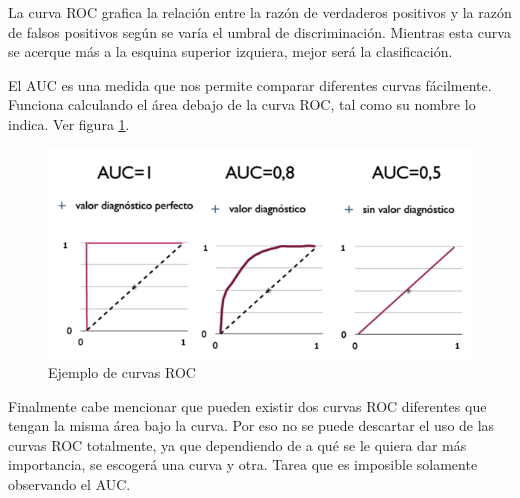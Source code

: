 La curva ROC grafica la relación entre la razón de verdaderos positivos y la razón de falsos positivos según se varía el umbral de discriminación. Mientras esta curva se acerque más a la esquina superior izquiera, mejor será la clasificación.

El \ac{AUC} es una medida que nos permite comparar diferentes curvas fácilmente. Funciona calculando el área debajo de la curva ROC, tal como su nombre lo indica. Ver figura \ref{fig:eg-roc}.

\begin{figure}[htbp]
	\centering
	\includegraphics[width=0.8\linewidth]{graficos/eg_roc.png}
	\caption{Ejemplo de curvas ROC \citep{wiki:roc_figure}}
	\label{fig:eg-roc}
\end{figure}

Finalmente cabe mencionar que pueden existir dos curvas ROC diferentes que tengan la misma área bajo la curva. Por eso no se puede descartar el uso de las curvas ROC totalmente, ya que dependiendo de a qué se le quiera dar más importancia, se escogerá una curva y otra. Tarea que es imposible solamente observando el \ac{AUC}.





